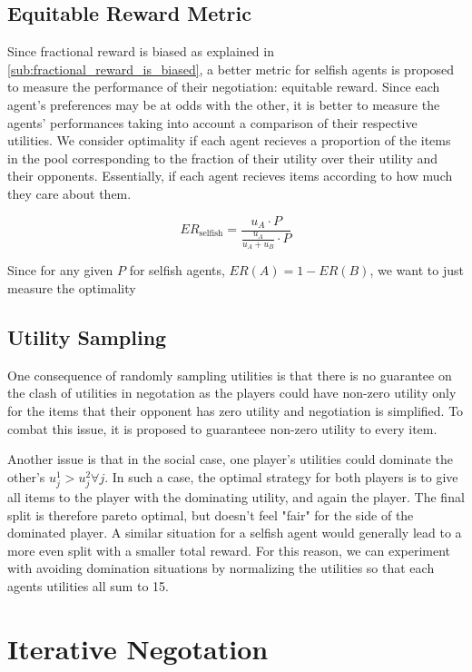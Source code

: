\documentclass{article}
\begin{document}
\subsection{Equitable Reward Metric}%
\label{sub:equitable_reward_metric}
Since fractional reward is biased as explained in
\ref{sub:fractional_reward_is_biased}, a better metric for selfish agents is
proposed to measure the performance of their negotiation: equitable reward.
Since each agent's preferences may be at odds with the other, it is better to
measure the agents' performances taking into account a comparison of their
respective utilities. We consider optimality if each agent recieves a proportion
of the items in the pool corresponding to the fraction of their utility over
their utility and their opponents. Essentially, if each agent recieves items
according to how much they care about them.

\begin{equation}
    ER_{\text{selfish}} = \frac{u_A \cdot P}{\frac{u_A}{u_A + u_B} \cdot P}
\end{equation}

Since for any given $P$ for selfish agents, $ER(A) = 1 - ER(B)$, we want to just
measure the optimality


\subsection{Utility Sampling}%
\label{sub:utility_sampling}
One consequence of randomly sampling utilities is that there is no
guarantee on the clash of utilities in negotation as the players could have
non-zero utility only for the items that their opponent has zero utility and
negotiation is simplified. To combat this issue, it is proposed to guaranteee
non-zero utility to every item.

Another issue is that in the social case, one player's utilities could dominate
the other's $u_j^1 > u_j^2 \forall j$. In such a case, the optimal strategy for
both players is to give all items to the player with the dominating utility, and
again the player. The final split is therefore pareto optimal, but doesn't feel
"fair" for the side of the dominated player. A similar situation for a selfish
agent would generally lead to a more even split with a smaller total reward. For
this reason, we can experiment with avoiding domination situations by
normalizing the utilities so that each agents utilities all sum to 15.

\section{Iterative Negotation}%
\label{sec:iterative_negotation}
\end{document}
